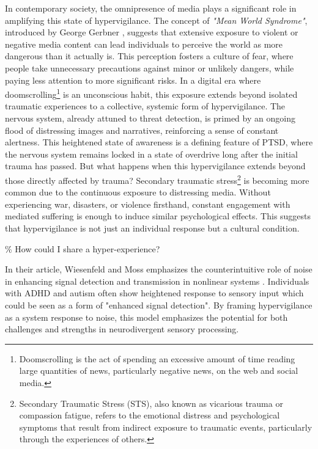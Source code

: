 In contemporary society, the omnipresence of media plays a significant role in amplifying this state of hypervigilance. The concept of \textit{"Mean World Syndrome"}, introduced by George Gerbner \citep{wiki:meanworld}, suggests that extensive exposure to violent or negative media content can lead individuals to perceive the world as more dangerous than it actually is. This perception fosters a culture of fear, where people take unnecessary precautions against minor or unlikely dangers, while paying less attention to more significant risks. In a digital era where doomscrolling\footnote{Doomscrolling is the act of spending an excessive amount of time reading large quantities of news, particularly negative news, on the web and social media.} is an unconscious habit, this exposure extends beyond isolated traumatic experiences to a collective, systemic form of hypervigilance. The nervous system, already attuned to threat detection, is primed by an ongoing flood of distressing images and narratives, reinforcing a sense of constant alertness.
% 
This heightened state of awareness is a defining feature of PTSD, where the nervous system remains locked in a state of overdrive long after the initial trauma has passed. But what happens when this hypervigilance extends beyond those directly affected by trauma? Secondary traumatic stress\footnote{Secondary Traumatic Stress (STS), also known as vicarious trauma or compassion fatigue, refers to the emotional distress and psychological symptoms that result from indirect exposure to traumatic events, particularly through the experiences of others.} is becoming more common due to the continuous exposure to distressing media. Without experiencing war, disasters, or violence firsthand, constant engagement with mediated suffering is enough to induce similar psychological effects. This suggests that hypervigilance is not just an individual response but a cultural condition.

{\scriptsize \textcolor{comment}{\%  How could I share a hyper-experience?}}

In their article, Wiesenfeld and Moss emphasizes the counterintuitive role of noise in enhancing signal detection and transmission in nonlinear systems \citep{wiesenfeld1995}. Individuals with ADHD and autism often show heightened response to sensory input which could be seen as a form of "enhanced signal detection". By framing hypervigilance as a system response to noise, this model emphasizes the potential for both challenges and strengths in neurodivergent sensory processing.



